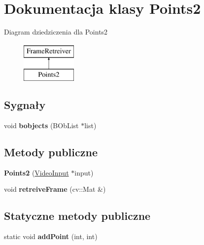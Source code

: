 \hypertarget{class_points2}{
\section{Dokumentacja klasy Points2}
\label{class_points2}
}
Diagram dziedziczenia dla Points2\begin{figure}[H]
\begin{center}
\leavevmode
\includegraphics[height=2cm]{class_points2}
\end{center}
\end{figure}
\subsection*{Sygnały}
\begin{DoxyCompactItemize}
\item 
\hypertarget{class_points2_a40606e5bff8ad0c1fc1887669d6e8e6e}{
void {\bfseries bobjects} (BObList $\ast$list)}
\label{class_points2_a40606e5bff8ad0c1fc1887669d6e8e6e}

\end{DoxyCompactItemize}
\subsection*{Metody publiczne}
\begin{DoxyCompactItemize}
\item 
\hypertarget{class_points2_a8ae4636b6fcd263753884959bb7d9ede}{
{\bfseries Points2} (\hyperlink{class_video_input}{VideoInput} $\ast$input)}
\label{class_points2_a8ae4636b6fcd263753884959bb7d9ede}

\item 
\hypertarget{class_points2_af46dd0cd21f73b3214d5f766349b8450}{
void {\bfseries retreiveFrame} (cv::Mat \&)}
\label{class_points2_af46dd0cd21f73b3214d5f766349b8450}

\end{DoxyCompactItemize}
\subsection*{Statyczne metody publiczne}
\begin{DoxyCompactItemize}
\item 
\hypertarget{class_points2_af00905a8a3803e51af17d1d3dbd7f33c}{
static void {\bfseries addPoint} (int, int)}
\label{class_points2_af00905a8a3803e51af17d1d3dbd7f33c}

\end{DoxyCompactItemize}

